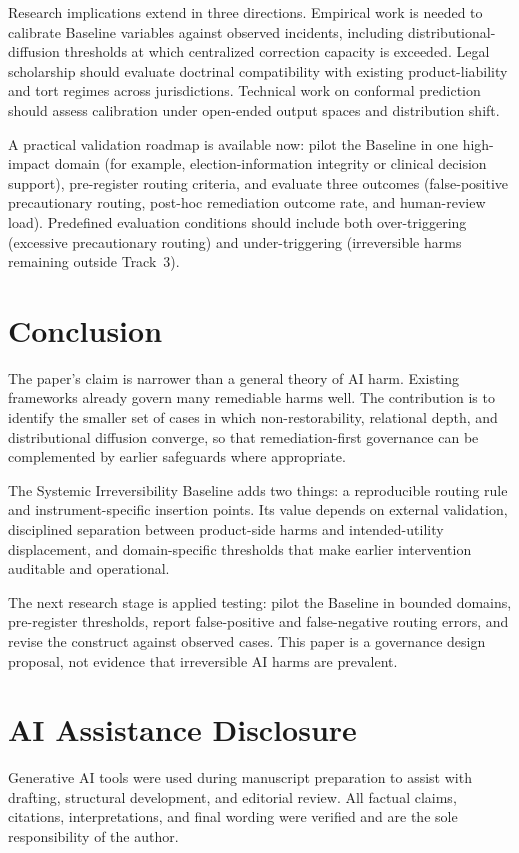 \documentclass[11pt]{article}
\begin{document}
Research implications extend in three directions. Empirical work is needed to calibrate Baseline variables against observed incidents, including distributional-diffusion thresholds at which centralized correction capacity is exceeded. Legal scholarship should evaluate doctrinal compatibility with existing product-liability and tort regimes across jurisdictions. Technical work on conformal prediction should assess calibration under open-ended output spaces and distribution shift.

A practical validation roadmap is available now: pilot the Baseline in one high-impact domain (for example, election-information integrity or clinical decision support), pre-register routing criteria, and evaluate three outcomes (false-positive precautionary routing, post-hoc remediation outcome rate, and human-review load). Predefined evaluation conditions should include both over-triggering (excessive precautionary routing) and under-triggering (irreversible harms remaining outside Track~3).

\section{Conclusion}

The paper's claim is narrower than a general theory of AI harm. Existing frameworks already govern many remediable harms well. The contribution is to identify the smaller set of cases in which non-restorability, relational depth, and distributional diffusion converge, so that remediation-first governance can be complemented by earlier safeguards where appropriate.

The Systemic Irreversibility Baseline adds two things: a reproducible routing rule and instrument-specific insertion points. Its value depends on external validation, disciplined separation between product-side harms and intended-utility displacement, and domain-specific thresholds that make earlier intervention auditable and operational.

The next research stage is applied testing: pilot the Baseline in bounded domains, pre-register thresholds, report false-positive and false-negative routing errors, and revise the construct against observed cases. This paper is a governance design proposal, not evidence that irreversible AI harms are prevalent.

\section*{AI Assistance Disclosure}

Generative AI tools were used during manuscript preparation to assist with drafting, structural development, and editorial review. All factual claims, citations, interpretations, and final wording were verified and are the sole responsibility of the author.

\newpage
\begingroup
\sloppy
\printbibliography[title={References}]
\endgroup
\end{document}
